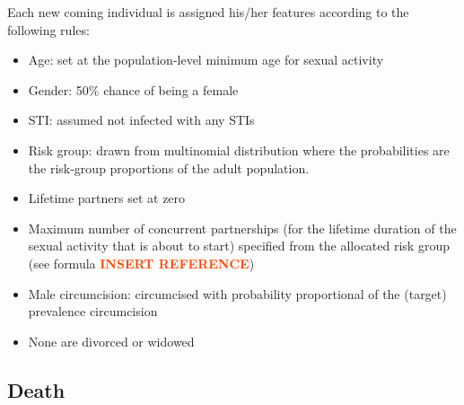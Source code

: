 \documentclass[11pt, onecolumn]{article}
\newcommand{\warning}[1]{\textbf{\textcolor{OrangeRed}{#1}}}
\begin{document}
Each new coming individual is assigned his/her features according to the following rules:
\begin{itemize}
\item Age: set at the population-level minimum age for sexual activity
\item Gender: 50\% chance of being a female
\item STI: assumed not infected with any STIs
\item Risk group: drawn from multinomial distribution where the probabilities are the risk-group proportions of the adult population.
\item Lifetime partners set at zero
\item Maximum number of concurrent partnerships (for the lifetime duration of the sexual activity that is about to start) specified from the allocated risk group (see formula \warning{INSERT REFERENCE})
\item Male circumcision: circumcised with probability proportional of the (target) prevalence circumcision
\item None are divorced or widowed
\end{itemize}


%
%
%
%

\subsection{Death}
\end{document}
